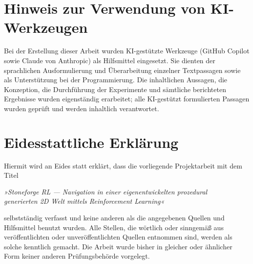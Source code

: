 \documentclass[
  a4paper,
  11pt,
  twoside,
  BCOR=8mm,           %
  headings=big,
  numbers=noenddot,
  listof=totoc,       %
  captions=tableheading,
]{scrreprt}
\begin{document}
\newpage
\thispagestyle{empty}
\mbox{}
\clearpage


\chapter*{Hinweis zur Verwendung von KI-Werkzeugen}
\thispagestyle{empty}

Bei der Erstellung dieser Arbeit wurden KI-gestützte Werkzeuge (GitHub Copilot
sowie Claude von Anthropic) als Hilfsmittel eingesetzt. Sie dienten der
sprachlichen Ausformulierung und Überarbeitung einzelner Textpassagen sowie
als Unterstützung bei der Programmierung. Die inhaltlichen Aussagen, die
Konzeption, die Durchführung der Experimente und sämtliche berichteten
Ergebnisse wurden eigenständig erarbeitet; alle KI-gestützt formulierten
Passagen wurden geprüft und werden inhaltlich verantwortet.

\clearpage

\chapter*{Eidesstattliche Erklärung}
\thispagestyle{empty}

Hiermit wird an Eides statt erklärt, dass die vorliegende Projektarbeit mit dem
Titel

\begin{center}
\itshape »Stoneforge RL — Navigation in einer eigenentwickelten prozedural\\
generierten 2D Welt mittels Reinforcement Learning«
\end{center}

selbstständig verfasst und keine anderen als die angegebenen Quellen und
Hilfsmittel benutzt wurden. Alle Stellen, die wörtlich oder sinngemäß aus
veröffentlichten oder unveröffentlichten Quellen entnommen sind, werden als
solche kenntlich gemacht. Die Arbeit wurde bisher in gleicher oder ähnlicher
Form keiner anderen Prüfungsbehörde vorgelegt.
\end{document}
